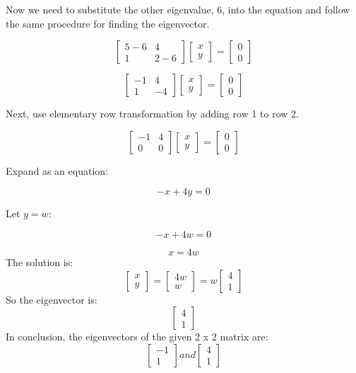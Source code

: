 Now we need to substitute the other eigenvalue, 6, into the equation and follow the same procedure for finding the eigenvector. 

$$\begin{bmatrix}
5-6 & 4\\
 1 & 2-6 
\end{bmatrix}
\begin{bmatrix}
x  \\
y 
\end{bmatrix} = 
\begin{bmatrix}
0  \\
0 
\end{bmatrix}$$

$$\begin{bmatrix}
-1 & 4\\
 1 & -4
\end{bmatrix}
\begin{bmatrix}
x  \\
y 
\end{bmatrix} = 
\begin{bmatrix}
0  \\
0 
\end{bmatrix}$$

Next, use elementary row transformation by adding row 1 to row 2.

$$\begin{bmatrix}
-1 & 4 \\
 0 & 0 
\end{bmatrix}
\begin{bmatrix}
x\\
y
\end{bmatrix} = 
\begin{bmatrix}
0\\
0 
\end{bmatrix}$$

Expand as an equation:

$$-x + 4y = 0$$

Let $y = w$:

$$-x + 4w = 0$$

$$x = 4w$$
The solution is:
$$\begin{bmatrix}
x\\
y 
\end{bmatrix}=
\begin{bmatrix}
4w\\
w 
\end{bmatrix} =
w\begin{bmatrix}
4\\
1 
\end{bmatrix}$$
So the eigenvector is:
$$\begin{bmatrix}
4\\
1
\end{bmatrix}$$
In conclusion, the eigenvectors of the given 2 x 2 matrix are:
$$\begin{bmatrix}
-1\\
1
\end{bmatrix}
and \begin{bmatrix}
4\\
1
\end{bmatrix}$$
